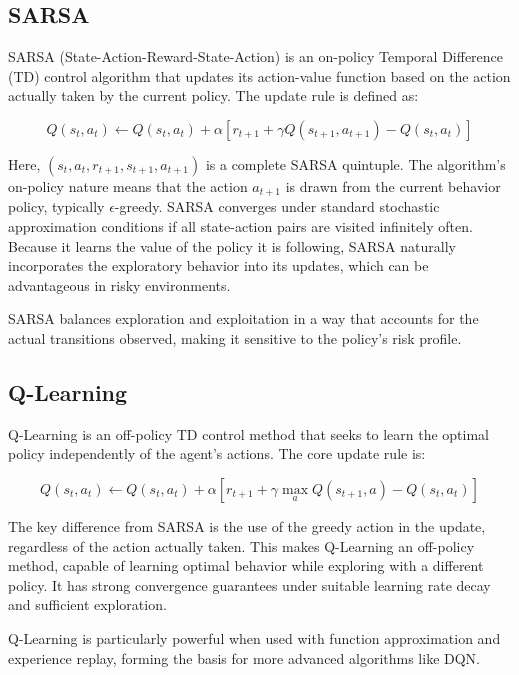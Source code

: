 \subsection{SARSA}

SARSA (State-Action-Reward-State-Action) is an on-policy Temporal Difference (TD) control algorithm that updates its action-value function based on the action actually taken by the current policy. The update rule is defined as:

\[
Q(s_t, a_t) \leftarrow Q(s_t, a_t) + \alpha \left[ r_{t+1} + \gamma Q(s_{t+1}, a_{t+1}) - Q(s_t, a_t) \right]
\]

Here, $(s_t, a_t, r_{t+1}, s_{t+1}, a_{t+1})$ is a complete SARSA quintuple. The algorithm’s on-policy nature means that the action $a_{t+1}$ is drawn from the current behavior policy, typically $\epsilon$-greedy. SARSA converges under standard stochastic approximation conditions if all state-action pairs are visited infinitely often. Because it learns the value of the policy it is following, SARSA naturally incorporates the exploratory behavior into its updates, which can be advantageous in risky environments.

\vspace{0.5em}
SARSA balances exploration and exploitation in a way that accounts for the actual transitions observed, making it sensitive to the policy's risk profile.

\subsection{Q-Learning}

Q-Learning is an off-policy TD control method that seeks to learn the optimal policy independently of the agent’s actions. The core update rule is:

\[
Q(s_t, a_t) \leftarrow Q(s_t, a_t) + \alpha \left[ r_{t+1} + \gamma \max_{a} Q(s_{t+1}, a) - Q(s_t, a_t) \right]
\]

The key difference from SARSA is the use of the greedy action in the update, regardless of the action actually taken. This makes Q-Learning an off-policy method, capable of learning optimal behavior while exploring with a different policy. It has strong convergence guarantees under suitable learning rate decay and sufficient exploration.

\vspace{0.5em}
Q-Learning is particularly powerful when used with function approximation and experience replay, forming the basis for more advanced algorithms like DQN.


